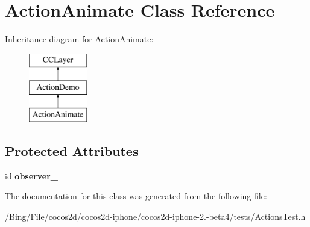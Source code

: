 \hypertarget{interface_action_animate}{\section{Action\-Animate Class Reference}
\label{interface_action_animate}
}
Inheritance diagram for Action\-Animate\-:\begin{figure}[H]
\begin{center}
\leavevmode
\includegraphics[height=3.000000cm]{interface_action_animate}
\end{center}
\end{figure}
\subsection*{Protected Attributes}
\begin{DoxyCompactItemize}
\item 
\hypertarget{interface_action_animate_ae5cb6d8cdbc02a6f4d46e79b88a0f9b1}{id {\bfseries observer\-\_\-}}\label{interface_action_animate_ae5cb6d8cdbc02a6f4d46e79b88a0f9b1}

\end{DoxyCompactItemize}


The documentation for this class was generated from the following file\-:\begin{DoxyCompactItemize}
\item 
/\-Bing/\-File/cocos2d/cocos2d-\/iphone/cocos2d-\/iphone-\/2.-\/beta4/tests/Actions\-Test.\-h\end{DoxyCompactItemize}
